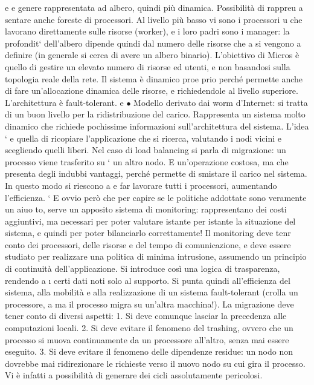 e
e
genere rappresentata ad albero, quindi più dinamica. Possibilità di rappreu
a
sentare anche foreste di processori. Al livello più basso vi sono i processori
u
che lavorano direttamente sulle risorse (worker), e i loro padri sono i manager: la profondit` dell'albero dipende
quindi dal numero delle risorse che
a
si vengono a definire (in generale si cerca di avere un albero binario). L'obiettivo di Micros è quello di gestire un
elevato numero di risorse ed utenti,
e
non basandosi sulla topologia reale della rete. Il sistema è dinamico proe
prio perché permette anche di fare un'allocazione dinamica delle risorse,
e
richiedendole al livello superiore. L'architettura è fault-tolerant.
e
$\bullet$ Modello derivato dai worm d'Internet: si tratta di un buon livello per
la ridistribuzione del carico. Rappresenta un sistema molto dinamico che
richiede pochissime informazioni sull'architettura del sistema. L'idea `
e
quella di ricopiare l'applicazione che si ricerca, valutando i nodi vicini e
scegliendo quelli liberi.
Nel caso di load balancing si parla di migrazione: un processo viene trasferito su
`
un altro nodo. E un'operazione costosa, ma che presenta degli indubbi vantaggi,
perché permette di smistare il carico nel sistema. In questo modo si riescono a
e
far lavorare tutti i processori, aumentando l'efficienza.
`
E ovvio però che per capire se le politiche addottate sono veramente un aiuo
to, serve un apposito sistema di monitoring: rappresentano dei costi aggiuntivi,
ma necessari per poter valutare istante per istante la situazione del sistema, e
quindi per poter bilanciarlo correttamente! Il monitoring deve tenr conto dei
processori, delle risorse e del tempo di comunicazione, e deve essere studiato per
realizzare una politica di minima intrusione, assumendo un principio di continuità dell'applicazione. Si introduce così
una logica di trasparenza, rendendo
a
\i{}
certi dati noti solo al supporto. Si punta quindi all'efficienza del sistema, alla
mobilità e alla realizzazione di un sistema fault-tolerant (crolla un processore,
a
ma il processo migra su un'altra macchina!).
La migrazione deve tener conto di diversi aspetti:
1. Si deve comunque lasciar la precedenza alle computazioni locali.
2. Si deve evitare il fenomeno del trashing, ovvero che un processo si muova
continuamente da un processore all'altro, senza mai essere eseguito.
3. Si deve evitare il fenomeno delle dipendenze residue: un nodo non dovrebbe
mai ridirezionare le richieste verso il nuovo nodo su cui gira il processo.
Vi è infatti a possibilità di generare dei cicli assolutamente pericolosi.
